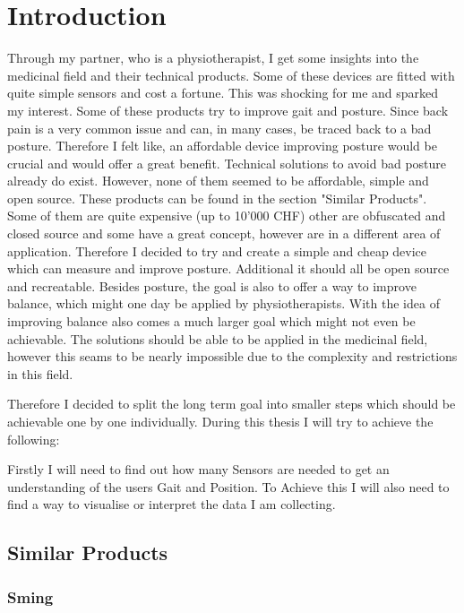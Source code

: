 \chapter*{Introduction}
\label{chap:Introduction}
\renewcommand{\thesection}{\arabic{section}}
\setcounter{section}{0}

Through my partner, who is a physiotherapist, I get some insights into the medicinal field and their technical products. Some of these devices are fitted with quite simple sensors and cost a fortune. This was shocking for me and sparked my interest. Some of these products try to improve gait and posture. Since back pain is a very common issue and can, in many cases, be traced back to a bad posture. Therefore I felt like, an affordable device improving posture would be crucial and would offer a great benefit.
Technical solutions to avoid bad posture already do exist. However, none of them seemed to be affordable, simple and open source. These products can be found in the section "Similar Products". Some of them are quite expensive (up to 10'000 CHF) other are obfuscated and closed source and some have a great concept, however are in a different area of application. Therefore I decided to try and create a simple and cheap device which can measure and improve posture. Additional it should all be open source and recreatable. Besides posture, the goal is also to offer a way to improve balance, which might one day be applied by physiotherapists.
With the idea of improving balance also comes a much larger goal which might not even be achievable. The solutions should be able to be applied in the medicinal field, however this seams to be nearly impossible due to the complexity and restrictions in this field. 

Therefore I decided to split the long term goal into smaller steps which should be achievable one by one individually. During this thesis I will try to achieve the following:

Firstly I will need to find out how many Sensors are needed to get an understanding of the users Gait and Position. To Achieve this I will also need to find a way to visualise or interpret the data I am collecting.

\section{Similar Products}

\subsection{Sming}

